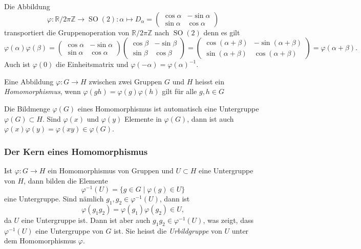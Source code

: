 Die Abbildung
\[
\varphi
\colon
\mathbb{R}/2\pi\mathbb{Z}
\to
\operatorname{SO}(2)
:
\alpha
\mapsto
D_\alpha
=
\begin{pmatrix}
\cos\alpha & -\sin\alpha \\
\sin\alpha &  \cos\alpha
\end{pmatrix}
\]
transportiert die Gruppenoperation von $\mathbb{R}/2\pi\mathbb{Z}$
nach $\operatorname{SO}(2)$ denn es gilt
\[
\varphi(\alpha)\varphi(\beta)
=
\begin{pmatrix}
\cos\alpha & -\sin\alpha \\
\sin\alpha &  \cos\alpha
\end{pmatrix}
\begin{pmatrix}
\cos\beta & -\sin\beta \\
\sin\beta &  \cos\beta
\end{pmatrix}
=
\begin{pmatrix}
\cos(\alpha+\beta) & -\sin(\alpha+\beta) \\
\sin(\alpha+\beta) &  \cos(\alpha+\beta)
\end{pmatrix}
=
\varphi(\alpha+\beta).
\]
Auch ist $\varphi(0)$ die Einheitsmatrix und
$\varphi(-\alpha)=\varphi(\alpha)^{-1}$.

\begin{definition}
\label{buch:gruppen:definition:def:homomorphismus}
Eine Abbildung $\varphi\colon G\to H$ zwischen zwei Gruppen $G$ und $H$
heisst ein {\em Homomorphismus}, wenn
$\varphi(gh)=\varphi(g)\varphi(h)$ gilt für alle $g,h\in G$
\end{definition}

Die Bildmenge $\varphi(G)$ eines Homomorphismus ist automatisch eine
Untergruppe $\varphi(G)\subset H$.
Sind $\varphi(x)$ und $\varphi(y)$ Elemente in $\varphi(G)$,
dann ist auch $\varphi(x)\varphi(y)=\varphi(xy)\in\varphi(G)$.

%
%
\subsubsection{Der Kern eines Homomorphismus}
Ist $\varphi\colon G\to H$ ein Homomorphismus von Gruppen und
$U\subset H$ eine Untergruppe von $H$, dann bilden die Elemente
\[
\varphi^{-1}(U)
=
\{g\in G\mid \varphi(g)\in U\}
\]
eine Untergruppe.
Sind nämlich $g_1,g_2\in\varphi^{-1}(U)$, dann ist
\[
\varphi(g_1g_2)
=
\varphi(g_1)\varphi(g_2)
\in U,
\]
da $U$ eine Untergruppe ist.
Dann ist aber auch $g_1g_2\in\varphi^{-1}(U)$, was zeigt, dass
$\varphi^{-1}(U)$ eine Untergruppe von $G$ ist.
Sie heisst die {\em Urbildgruppe} von $U$ unter dem Homomorphismus
$\varphi$.

